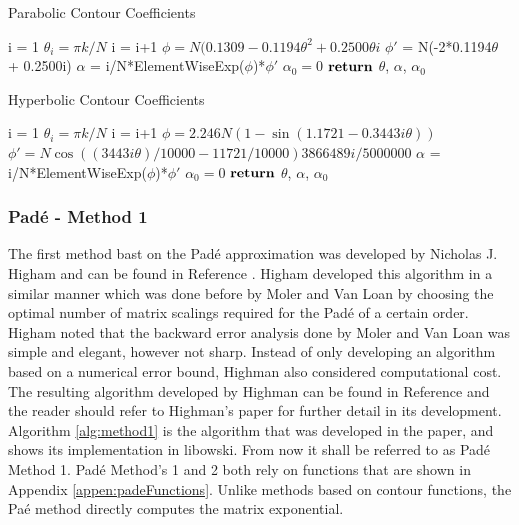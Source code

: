 \begin{algorithm}
	\caption{Parabolic Contour Coefficients} 
	\begin{algorithmic}[1]
		\State i = 1 
		 
		    \State $\theta_{i} = \pi k/N$
		    \State i = i+1
		\EndFor
		\State $\phi = N(0.1309 - 0.1194\theta^{2} + 0.2500\theta i$ 
		\State $\phi'$ = N(-2*0.1194$\theta$ + 0.2500i) 
		\State $\alpha$ = i/N*ElementWiseExp($\phi$)*$\phi'$ 
		\State $\alpha_{0} = 0$
		\State ${\text{\textbf{return}}}$ $\theta$, $\alpha$, $\alpha_{0}$
		\EndProcedure
	\end{algorithmic} 
	\label{alg:parabolicCoeffs}
\end{algorithm}

\begin{algorithm}
	\caption{Hyperbolic Contour Coefficients} 
	\begin{algorithmic}[1]
		\State i = 1  
		 
		    \State $\theta_{i} = \pi k/N$
		    \State i = i+1
		\EndFor
		\State $\phi = 2.246N(1 - \sin(1.1721 - 0.3443i\theta))$ 
		\State $\phi' = N\cos((3443i\theta) /10000 - 11721/10000)3866489i/5000000$ 
		\State $\alpha$ = i/N*ElementWiseExp($\phi$)*$\phi'$ 
		\State $\alpha_{0} = 0$
		\State ${\text{\textbf{return}}}$ $\theta$, $\alpha$, $\alpha_{0}$
		\EndProcedure
	\end{algorithmic} 
	\label{alg:hyperbolicCoeffs}
\end{algorithm}

\subsubsection{Pad\'e - Method 1}
The first method bast on the Pad\'e approximation was developed by Nicholas J. Higham and can be found in Reference \cite{higham2005}. Higham developed this algorithm in a similar manner which was done before by Moler and Van Loan \cite{moler2003} by choosing the optimal number of matrix scalings required for the Pad\'e of a certain order. Higham noted that the backward error analysis done by Moler and Van Loan was simple and elegant, however not sharp. Instead of only developing an algorithm based on a numerical error bound, Highman also considered computational cost. The resulting algorithm developed by Highman can be found in Reference \cite{higham2005} and the reader should refer to Highman's paper for further detail in its development. Algorithm \ref{alg:method1} is the algorithm that was developed in the paper, and shows its implementation in libowski. From now it shall be referred to as Pad\'e Method 1. Pad\'e Method's 1 and 2 both rely on functions that are shown in Appendix \ref{appen:padeFunctions}. Unlike methods based on contour functions, the Pa\'e method directly computes the matrix exponential. 

